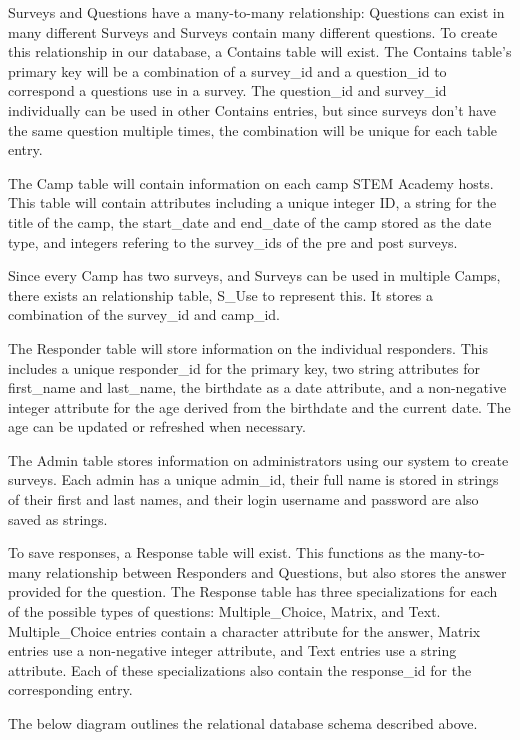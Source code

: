 \documentclass[letterpaper,10pt,serif, draftclsnofoot,onecolumn, compsoc, titlepage]{IEEEtran}
\begin{document}
Surveys and Questions have a many-to-many relationship: Questions can exist in many different Surveys and Surveys contain many different questions.
To create this relationship in our database, a Contains table will exist.
The Contains table's primary key will be a combination of a survey\_id and a question\_id to correspond a questions use in a survey.
The question\_id and survey\_id individually can be used in other Contains entries, but since surveys don't have the same question multiple times, the combination will be unique for each table entry.

The Camp table will contain information on each camp STEM Academy hosts.
This table will contain attributes including a unique integer ID, a string for the title of the camp, the start\_date and end\_date of the camp stored as the date type, and integers refering to the survey\_ids of the pre and post surveys.

Since every Camp has two surveys, and Surveys can be used in multiple Camps, there exists an relationship table, S\_Use to represent this.
It stores a combination of the survey\_id and camp\_id.

The Responder table will store information on the individual responders.
This includes a unique responder\_id for the primary key, two string attributes for first\_name and last\_name, the birthdate as a date attribute, and a non-negative integer attribute for the age derived from the birthdate and the current date.
The age can be updated or refreshed when necessary.

The Admin table stores information on administrators using our system to create surveys.
Each admin has a unique admin\_id, their full name is stored in strings of their first and last names, and their login username and password are also saved as strings.

To save responses, a Response table will exist.
This functions as the many-to-many relationship between Responders and Questions, but also stores the answer provided for the question.
The Response table has three specializations for each of the possible types of questions: Multiple\_Choice, Matrix, and Text.
Multiple\_Choice entries contain a character attribute for the answer, Matrix entries use a non-negative integer attribute, and Text entries use a string attribute.
Each of these specializations also contain the response\_id for the corresponding entry.

The below diagram outlines the relational database schema described above.
\end{document}
